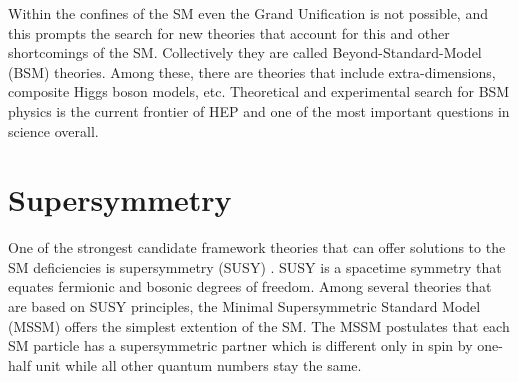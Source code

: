 Within the confines of the SM even the Grand Unification is not possible, and this prompts the search for new theories that account for this and other shortcomings of the SM. Collectively they are called Beyond-Standard-Model (BSM) theories. Among these, there are theories that include extra-dimensions, composite Higgs boson models, etc. Theoretical and experimental search for BSM physics is the current frontier of HEP and one of the most important questions in science overall. 


\section{Supersymmetry}
One of the strongest candidate framework theories that can offer solutions to the SM deficiencies is supersymmetry (SUSY) \citep{Lykken:1996xt}. SUSY is a spacetime symmetry that equates fermionic and bosonic degrees of freedom. Among several theories that are based on SUSY principles, the Minimal Supersymmetric Standard Model (MSSM) offers the simplest extention of the SM. The MSSM postulates that each SM particle has a supersymmetric partner which is  different only in spin by one-half unit %
while all other quantum numbers stay the same. 
